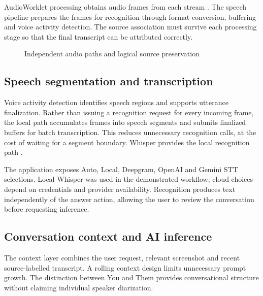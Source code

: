 \documentclass[openany]{tietreport}
\begin{document}
AudioWorklet processing obtains audio frames from each stream \cite{worklet,media}. The speech pipeline prepares the frames for recognition through format conversion, buffering and voice activity detection. The source association must survive each processing stage so that the final transcript can be attributed correctly.
\begin{figure}[htbp]\centering
{}\caption{Independent audio paths and logical source preservation}\end{figure}
\subsection{Speech segmentation and transcription}
Voice activity detection identifies speech regions and supports utterance finalization. Rather than issuing a recognition request for every incoming frame, the local path accumulates frames into speech segments and submits finalized buffers for batch transcription. This reduces unnecessary recognition calls, at the cost of waiting for a segment boundary. Whisper provides the local recognition path \cite{whisper}.

The application exposes Auto, Local, Deepgram, OpenAI and Gemini STT selections. Local Whisper was used in the demonstrated workflow; cloud choices depend on credentials and provider availability. Recognition produces text independently of the answer action, allowing the user to review the conversation before requesting inference.
\subsection{Conversation context and AI inference}
The context layer combines the user request, relevant screenshot and recent source-labelled transcript. A rolling context design limits unnecessary prompt growth. The distinction between You and Them provides conversational structure without claiming individual speaker diarization.
\end{document}
